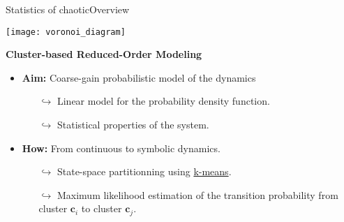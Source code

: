 \begin{frame}[t, c]{Statistics of chaotic}{Overview}
  \begin{minipage}{.28\textwidth}
    \centering
    \texttt{[image: voronoi\_diagram]}
  \end{minipage}%
  \hfill
  \begin{minipage}{.68\textwidth}
    \begin{block}{}
      \centering
      \textbf{Cluster-based Reduced-Order Modeling}
    \end{block}
    
    \medskip
    
    \begin{itemize}
    \item \textbf{Aim:} Coarse-gain probabilistic model of the dynamics
      \begin{itemize}
      \item[\(	\hookrightarrow	\)] Linear model for the probability density function.
      \item[\(	\hookrightarrow	\)] Statistical properties of the system.
      \end{itemize}
      
      \medskip
      
    \item \textbf{How:} From continuous to symbolic dynamics.
      \begin{itemize}
      \item[\(	\hookrightarrow	\)] State-space partitionning using \underline{k-means}.
      \item[\(	\hookrightarrow	\)] Maximum likelihood estimation of the transition probability from cluster \( \bm{c}_i \) to cluster \( \bm{c}_j \).
      \end{itemize}
    \end{itemize}
  \end{minipage}
  
  \vspace{1cm}
\end{frame}

